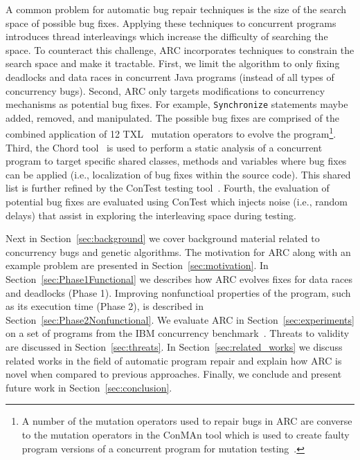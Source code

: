 \documentclass[runningheads,a4paper]{llncs}
\begin{document}
A common problem for automatic bug repair techniques is the size of the search space of possible bug fixes. Applying these techniques to  concurrent programs introduces thread interleavings which increase the difficulty of searching the space. To counteract this challenge, ARC incorporates techniques to constrain the search space and make it tractable. First, we limit the algorithm to only fixing deadlocks and data races in concurrent Java programs (instead of all types of concurrency bugs). Second, ARC only targets modifications to concurrency mechanisms as potential bug fixes. For example, \texttt{Synchronize} statements maybe added, removed, and manipulated. The possible bug fixes are comprised of the combined application of 12 TXL~\cite{CHP91} mutation operators to evolve the program\footnote{A number of the mutation operators used to repair bugs in ARC are converse to the mutation operators in the ConMAn tool which is used to create faulty program versions of a concurrent program for mutation testing~\cite{BCD06}.}.  Third, the Chord tool~\cite{NA07} is used to perform a static analysis of a concurrent program to target specific shared classes, methods and variables where bug fixes can be applied (i.e., localization of bug fixes within the source code). This shared list is further refined by the ConTest testing tool~\cite{EFN+02}. Fourth, the evaluation of potential bug fixes are evaluated using ConTest which injects noise (i.e., random delays) that assist in exploring the interleaving space during testing. 


Next in Section~\ref{sec:background} we cover background material related to concurrency bugs and genetic algorithms. The motivation for ARC along with an example problem are presented in Section~\ref{sec:motivation}. In Section~\ref{sec:Phase1Functional} we describes how ARC evolves fixes for data races and deadlocks (Phase 1). Improving nonfunctioal properties of the program, such as its execution time (Phase 2), is described in Section~\ref{sec:Phase2Nonfunctional}. We evaluate ARC in Section~\ref{sec:experiments} on a set of programs from the IBM concurrency benchmark~\cite{HSU03, EU04, ETU08}. Threats to validity are discussed in Section~\ref{sec:threats}. In Section~\ref{sec:related_works} we discuss related works in the field of automatic program repair and explain how ARC is novel when compared to previous approaches. Finally, we conclude and present future work in Section~\ref{sec:conclusion}.
\end{document}
